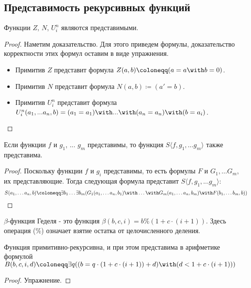\subsection{Представимость рекурсивных функций}

\begin{theorem} Функции $Z$, $N$, $U^n_i$ являются представимыми. \end{theorem}
\begin{proof}
Наметим доказательство. Для этого приведем формулы, доказательство корректности этих 
формул оставим в виде упражнения.
\begin{itemize}
\item Примитив $Z$ представит формула $Z (a, b) \coloneqq  (a=a \with b=0)$.
\item Примитив $N$ представит формула $N (a, b) \coloneqq  (a' = b)$.
\item Примитив $U^n_i$ представит формула $U^n_i (a_1, ...a_n, b) = (a_1=a_1) \with ... \with (a_n=a_n) \with (b= a_i)$.
\end{itemize}
\end{proof}

\begin{theorem} Если функции $f$ и $g_1$, ... $g_m$ представимы, 
то функция $S\langle{}f,g_1,\dots g_m\rangle$ также представима. \end{theorem}
\begin{proof}Поскольку функции $f$ и $g_i$ представимы, то есть формулы $F$ и $G_1, \dots G_m$,
их представляющие. Тогда следующая формула представит $S\langle{}f,g_1,\dots g_m\rangle$: 
$$S (a_1, \dots a_n, b) \coloneqq  \exists b_1 \dots \exists b_m 
  (G_1 (a_1, \dots a_n, b_1) \with \dots \with G_m (a_1, \dots a_n, b_m) \with F (b_1, \dots b_m, b))$$
\end{proof}

\begin{definition}
$\beta$-функция Геделя - это функция $\beta (b,c,i) = b \% (1 + c \cdot (i + 1))$. Здесь операция (\%) означает
взятие остатка от целочисленного деления.
\end{definition}

\begin{lemma}Функция примитивно-рекурсивна, и при этом представима в арифметике 
формулой $B (b,c,i,d) \coloneqq  \exists q ((b = q \cdot (1 + c \cdot (i+1)) + d) \with (d < 1 + c \cdot (i+1)))$
\end{lemma}
\begin{proof}Упражнение.\end{proof}


